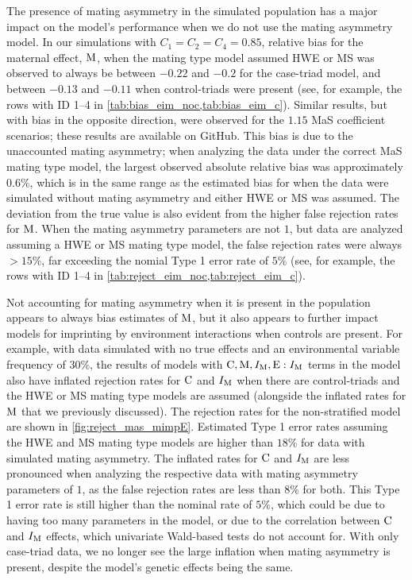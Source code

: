 The presence of mating asymmetry in the simulated population has a major impact on the model's performance when we do not use the mating asymmetry model.
In our simulations with $C_1 = C_2 = C_4 = 0.85$, relative bias for the maternal effect, ${\rm M}$, when the mating type model assumed HWE or MS was observed to always be between $-0.22$ and $-0.2$ for the case-triad model, and between $-0.13$ and $-0.11$ when control-triads were present (see, for example, the rows with ID 1--4 in \cref{tab:bias_eim_noc,tab:bias_eim_c}).
Similar results, but with bias in the opposite direction, were observed for the $1.15$ MaS coefficient scenarios; these results are available on GitHub.
This bias is due to the unaccounted mating asymmetry; when analyzing the data under the correct MaS mating type model, the largest observed absolute relative bias was approximately $0.6\%$, which is in the same range as the estimated bias for when the data were simulated without mating asymmetry and either HWE or MS was assumed.
The deviation from the true value is also evident from the higher false rejection rates for ${\rm M}$.
When the mating asymmetry parameters are not $1$, but data are analyzed assuming a HWE or MS mating type model, the false rejection rates were always $> 15\%$, far exceeding the nomial Type 1 error rate of $5\%$ (see, for example, the rows with ID 1--4 in \cref{tab:reject_eim_noc,tab:reject_eim_c}).

Not accounting for mating asymmetry when it is present in the population appears to always bias estimates of ${\rm M}$, but it also appears to further impact models for imprinting by environment interactions when controls are present.
For example, with data simulated with no true effects and an environmental variable frequency of $30\%$, the results of models with ${\rm C}, {\rm M}, I_{{\rm M}}, {\rm E}:I_{{\rm M}}$ terms in the model also have inflated rejection rates for ${\rm C}$ and $I_{{\rm M}}$ when there are control-triads and the HWE or MS mating type models are assumed (alongside the inflated rates for ${\rm M}$ that we previously discussed).
The rejection rates for the non-stratified model are shown in \cref{fig:reject_mas_mimpE}.
Estimated Type 1 error rates assuming the HWE and MS mating type models are higher than $18\%$ for data with simulated mating asymmetry.
The inflated rates for ${\rm C}$ and $I_{{\rm M}}$ are less pronounced when analyzing the respective data with mating asymmetry parameters of $1$, as the false rejection rates are less than $8\%$ for both.
This Type 1 error rate is still higher than the nominal rate of $5\%$, which could be due to having too many parameters in the model, or due to the correlation between ${\rm C}$ and $I_{{\rm M}}$ effects, which univariate Wald-based tests do not account for.
With only case-triad data, we no longer see the large inflation when mating asymmetry is present, despite the model's genetic effects being the same.

